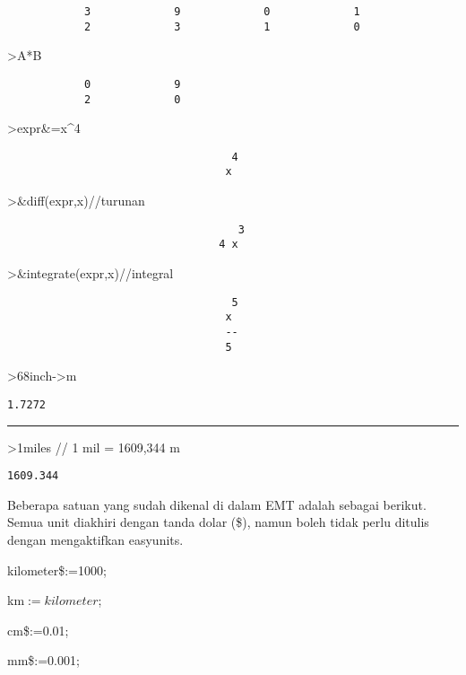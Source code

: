 \documentclass[
]{book}
\begin{document}
\begin{verbatim}
            3             9             0             1 
            2             3             1             0 
\end{verbatim}

\textgreater A*B

\begin{verbatim}
            0             9 
            2             0 
\end{verbatim}

\textgreater expr\&=x\^{}4

\begin{verbatim}
                                   4
                                  x
\end{verbatim}

\textgreater\&diff(expr,x)//turunan

\begin{verbatim}
                                    3
                                 4 x
\end{verbatim}

\textgreater\&integrate(expr,x)//integral

\begin{verbatim}
                                   5
                                  x
                                  --
                                  5
\end{verbatim}

\textgreater68inch-\textgreater m

\begin{verbatim}
1.7272
\end{verbatim}

\begin{center}\rule{0.5\linewidth}{0.5pt}\end{center}

\textgreater1miles // 1 mil = 1609,344 m

\begin{verbatim}
1609.344
\end{verbatim}

Beberapa satuan yang sudah dikenal di dalam EMT adalah sebagai berikut. Semua unit diakhiri dengan tanda dolar (\$), namun boleh tidak perlu ditulis dengan mengaktifkan easyunits.

kilometer\$:=1000;

km\(:=kilometer\);

cm\$:=0.01;

mm\$:=0.001;
\end{document}
